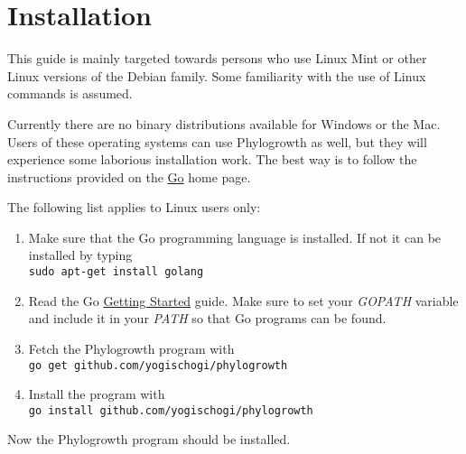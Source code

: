 \section{Installation}

This guide is mainly targeted towards persons who use Linux Mint
or other Linux versions of the Debian family. Some familiarity
with the use of Linux commands is assumed.

Currently there are no binary distributions available for
Windows or the Mac. Users of these operating systems can
use Phylogrowth as well, but they will experience some
laborious installation work. The best way is to follow the
instructions provided on the
\href{http://golang.org/}{Go} home page.

The following list applies to Linux users only:

\begin{enumerate}
\item Make sure that the Go programming language is installed.
	If not it can be installed by typing\\
	\texttt{sudo apt-get install golang}
\item Read the Go
	\href{http://golang.org/doc/install}{Getting Started}
	guide. Make sure to set your \emph{GOPATH} variable and
	include it in your \emph{PATH} so that Go programs can be
	found.
\item Fetch the Phylogrowth program with\\
	\texttt{go get github.com/yogischogi/phylogrowth}
\item Install the program with\\
	 \texttt{go install github.com/yogischogi/phylogrowth}
\end{enumerate}

Now the Phylogrowth program should be installed.

